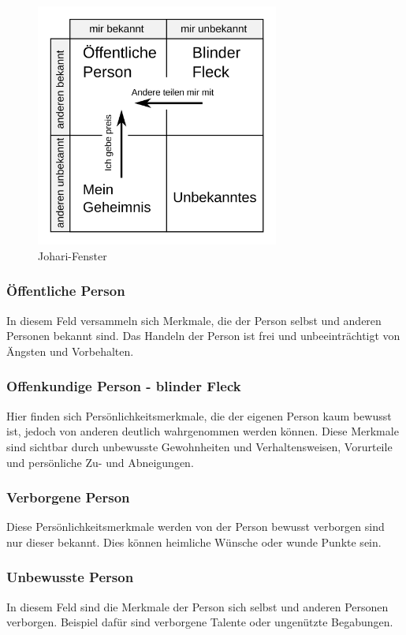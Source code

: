 \begin{figure}[h]
    \begin{center}
        \includegraphics*[width=8cm]{./pics/Johari.png}
        \caption[Johari-Fenster]{Johari-Fenster \cite{Johari}}
    \end{center}
\end{figure}

\subsubsection{Öffentliche Person}
In diesem Feld versammeln sich Merkmale, die der Person selbst und anderen Personen bekannt sind. 
Das Handeln der Person ist frei und unbeeinträchtigt von Ängsten und Vorbehalten.

\subsubsection{Offenkundige Person - blinder Fleck}
Hier finden sich Persönlichkeitsmerkmale, die der eigenen Person kaum bewusst ist, jedoch von anderen deutlich 
wahrgenommen werden können. Diese Merkmale sind sichtbar durch unbewusste Gewohnheiten und Verhaltensweisen, Vorurteile und 
persönliche Zu- und Abneigungen.

\subsubsection{Verborgene Person}
Diese Persönlichkeitsmerkmale werden von der Person bewusst verborgen sind nur dieser bekannt. Dies können 
heimliche Wünsche oder wunde Punkte sein.

\subsubsection{Unbewusste Person}
In diesem Feld sind die Merkmale der Person sich selbst und anderen Personen verborgen. Beispiel dafür sind 
verborgene Talente oder ungenützte Begabungen.

